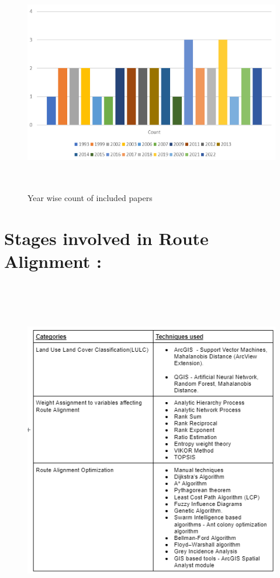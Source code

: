 \begin{figure}[H]
	\includegraphics[width=475pt,height=275pt]{year_wise_count.png}
	\caption{Year wise count of included papers}
\end{figure}
\section{Stages involved in Route Alignment : }
\begin{figure}[H]
	\includegraphics[width=475pt,height=425pt]{stages.png}
\end{figure}
